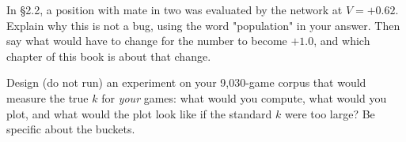 \begin{exercises}
 In §2.2, a position with mate in two
was evaluated by the network at $V = +0.62$. Explain why this is not a bug, using the word
"population" in your answer. Then say what would have to change for the number to become
$+1.0$, and which chapter of this book is about that change.

 Design (do not run) an experiment on your
9{,}030-game corpus that would measure the true $k$ for \emph{your} games: what would you
compute, what would you plot, and what would the plot look like if the standard $k$ were too
large? Be specific about the buckets.

\end{exercises}
